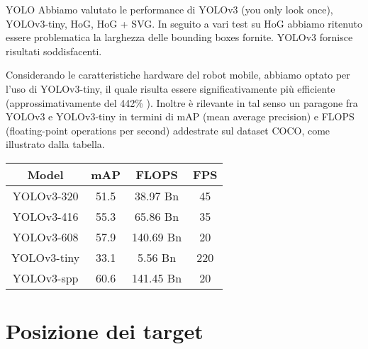 \documentclass[10pt]{beamer}
\begin{document}
	\begin{frame}{YOLO}
		Abbiamo valutato le performance di YOLOv3 (you only look once),\\
		YOLOv3-tiny, HoG, HoG + SVG. In seguito a vari test su HoG abbiamo
		ritenuto essere problematica la larghezza delle bounding boxes fornite.
		YOLOv3 fornisce risultati soddisfacenti.
		
		Considerando le caratteristiche hardware del robot mobile, abbiamo
		optato per l'uso di YOLOv3-tiny, il quale risulta essere
		significativamente più efficiente (approssimativamente del 442\%
		\cite{tiny_yolo}). Inoltre è rilevante in tal senso un paragone fra
		YOLOv3 e YOLOv3-tiny in termini di mAP (mean average precision) e FLOPS
		(floating-point operations per second) addestrate sul dataset COCO,
		come illustrato dalla tabella.
		
		\begin{table}[htpb]
			\centering
			\begin{tabular}{ c c c c } 
				\hline
				\textbf{Model} & \textbf{mAP} & \textbf{FLOPS} & \textbf{FPS} \\
				\hline	
				 YOLOv3-320    & 51.5  &  38.97  Bn  &  45  \\ 
				 YOLOv3-416    & 55.3  &  65.86  Bn  &  35  \\ 
				 YOLOv3-608    & 57.9  &  140.69 Bn  &  20  \\ 
				 YOLOv3-tiny   & 33.1  &  5.56   Bn  &  220 \\
				 YOLOv3-spp    & 60.6  &  141.45 Bn  &  20  \\
				\hline
			\end{tabular}
			\label{tab:comparison}
		\end{table}
	\end{frame}

	\section{Posizione dei target}\label{sec:Posizione-dei-target}
	\frame{\sectionpage}
	
\end{document}
